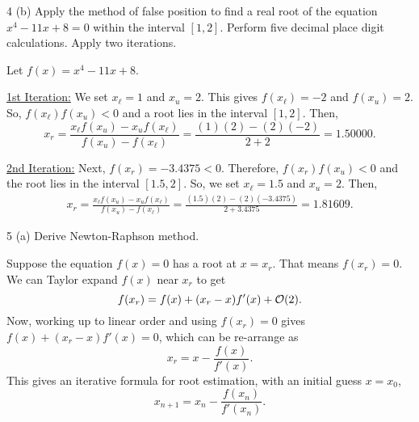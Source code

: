 \documentclass[11pt]{penrose}
\begin{document}
\begin{problem}{4 (b)}
    Apply the method of false position to find a real root of the equation $x^4 - 11x + 8 = 0$ within the interval $[1,2]$. Perform five decimal place digit calculations. Apply two iterations.

    \solution Let $f(x) = x^4 - 11x + 8$.

    \underline{1st Iteration:}
    We set $x_\ell = 1$ and $x_u = 2$. This gives $f(x_\ell) = -2$ and $f(x_u) = 2$. So, $f(x_\ell)f(x_u) < 0$ and a root lies in the interval $[1,2]$. Then,
    \begin{equation*}
        x_r = \frac{x_\ell f(x_u) - x_u f(x_\ell)}{f(x_u) - f(x_\ell)} = \frac{(1)(2) - (2)(-2)}{2 + 2} = 1.50000.
    \end{equation*}
    
    \underline{2nd Iteration:}
    Next, $f(x_r) = -3.4375 < 0$. Therefore, $f(x_r)f(x_u) < 0$ and the root lies in the interval $[1.5, 2]$. So, we set $x_\ell = 1.5$ and $x_u = 2$. Then,
    \begin{align*}
        x_r = \frac{x_\ell f(x_u) - x_u f(x_\ell)}{f(x_u) - f(x_\ell)} = \frac{(1.5)(2) - (2)(-3.4375)}{2 + 3.4375} = 1.81609.
    \end{align*}
\end{problem}

\begin{problem}{5 (a)}
    Derive Newton-Raphson method.

    \solution Suppose the equation $f(x) = 0$ has a root at $x = x_r$. That means $f(x_r) = 0$. We can Taylor expand $f(x)$ near $x_r$ to get
    \begin{equation*}
        f(x_r) = f(x) + (x_r - x) f'(x) + \mathcal{O}(2).
    \end{equation*}
    Now, working up to linear order and using $f(x_r) = 0$ gives $f(x) + (x_r - x) f'(x) = 0$, which can be re-arrange as
    \begin{equation*}
        x_r = x - \frac{f(x)}{f'(x)}.
    \end{equation*}
    This gives an iterative formula for root estimation, with an initial guess $x = x_0$,
    \begin{equation*}
        x_{n+1} = x_n - \frac{f(x_n)}{f'(x_n)}.
    \end{equation*}
\end{problem}
\end{document}
